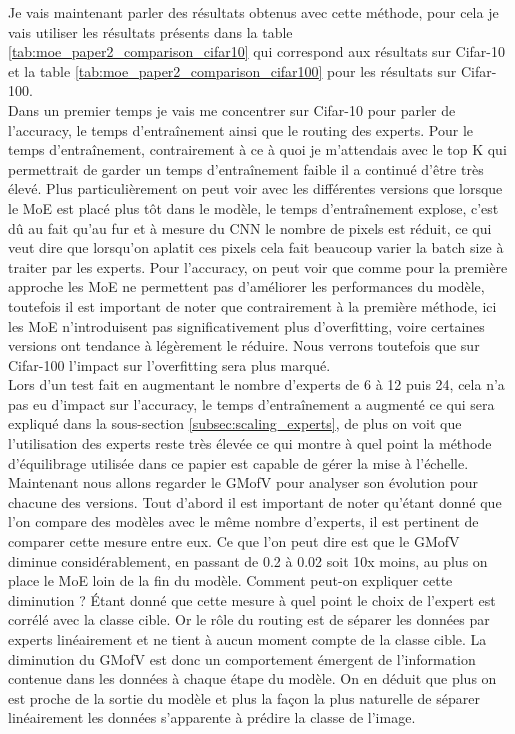 \documentclass{article}
\begin{document}
Je vais maintenant parler des résultats obtenus avec cette méthode, pour cela je vais utiliser les résultats présents dans la table \ref{tab:moe_paper2_comparison_cifar10} qui correspond aux résultats sur Cifar-10 et la table \ref{tab:moe_paper2_comparison_cifar100} pour les résultats sur Cifar-100.\\
Dans un premier temps je vais me concentrer sur Cifar-10 pour parler de l'accuracy, le temps d'entraînement ainsi que le routing des experts. Pour le temps d'entraînement, contrairement à ce à quoi je m'attendais avec le top K qui permettrait de garder un temps d'entraînement faible il a continué d'être très élevé. Plus particulièrement on peut voir avec les différentes versions que lorsque le MoE est placé plus tôt dans le modèle, le temps d'entraînement explose, c'est dû au fait qu'au fur et à mesure du CNN le nombre de pixels est réduit, ce qui veut dire que lorsqu'on aplatit ces pixels cela fait beaucoup varier la batch size à traiter par les experts. Pour l'accuracy, on peut voir que comme pour la première approche les MoE ne permettent pas d'améliorer les performances du modèle, toutefois il est important de noter que contrairement à la première méthode, ici les MoE n'introduisent pas significativement plus d'overfitting, voire certaines versions ont tendance à légèrement le réduire. Nous verrons toutefois que sur Cifar-100 l'impact sur l'overfitting sera plus marqué. \\
Lors d'un test fait en augmentant le nombre d'experts de 6 à 12 puis 24, cela n'a pas eu d'impact sur l'accuracy, le temps d'entraînement a augmenté ce qui sera expliqué dans la sous-section \ref{subsec:scaling_experts}, de plus on voit que l'utilisation des experts reste très élevée ce qui montre à quel point la méthode d'équilibrage utilisée dans ce papier est capable de gérer la mise à l'échelle.\\
Maintenant nous allons regarder le GMofV pour analyser son évolution pour chacune des versions. Tout d'abord il est important de noter qu'étant donné que l'on compare des modèles avec le même nombre d'experts, il est pertinent de comparer cette mesure entre eux. Ce que l'on peut dire est que le GMofV diminue considérablement, en passant de 0.2 à 0.02 soit 10x moins, au plus on place le MoE loin de la fin du modèle. Comment peut-on expliquer cette diminution ? Étant donné que cette mesure à quel point le choix de l'expert est corrélé avec la classe cible. Or le rôle du routing est de séparer les données par experts linéairement et ne tient à aucun moment compte de la classe cible. La diminution du GMofV est donc un comportement émergent de l'information contenue dans les données à chaque étape du modèle. On en déduit que plus on est proche de la sortie du modèle et plus la façon la plus naturelle de séparer linéairement les données s'apparente à prédire la classe de l'image. \\
\end{document}
